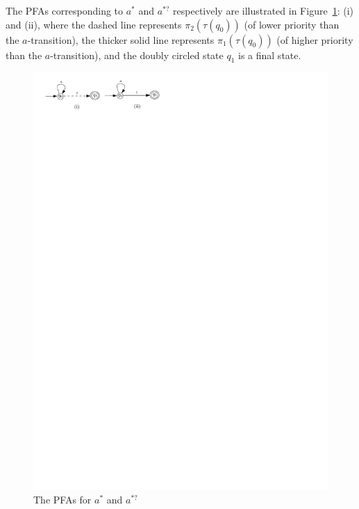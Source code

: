 \begin{example}\label{exmp-pfa}
The PFAs corresponding to $a^\ast$ and $a^{\ast?}$ respectively are illustrated in Figure~\ref{fig-pfa}: (i) and (ii), where the dashed line represents $\pi_2(\tau(q_0))$ (of lower priority than the $a$-transition), the thicker solid line represents $\pi_1(\tau(q_0))$ (of higher priority than the $a$-transition), and the doubly circled state $q_1$ is a final state.

\begin{figure}[ht]
\centering
\includegraphics[scale=0.8]{pfa.pdf}
\caption{The PFAs for $a^\ast$ and $a^{\ast?}$}
\label{fig-pfa}
\end{figure}

\end{example}


